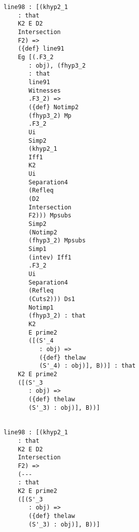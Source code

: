 \documentclass[12pt]{article}
\begin{document}
\begin{verbatim}
                                 line98 : [(khyp2_1 
                                     : that 
                                     K2 E D2 
                                     Intersection 
                                     F2) => 
                                     ({def} line91 
                                     Eg [(.F3_2 
                                        : obj), (fhyp3_2 
                                        : that 
                                        line91 
                                        Witnesses 
                                        .F3_2) => 
                                        ({def} Notimp2 
                                        (fhyp3_2) Mp 
                                        .F3_2 
                                        Ui 
                                        Simp2 
                                        (khyp2_1 
                                        Iff1 
                                        K2 
                                        Ui 
                                        Separation4 
                                        (Refleq 
                                        (D2 
                                        Intersection 
                                        F2))) Mpsubs 
                                        Simp2 
                                        (Notimp2 
                                        (fhyp3_2) Mpsubs 
                                        Simp1 
                                        (intev) Iff1 
                                        .F3_2 
                                        Ui 
                                        Separation4 
                                        (Refleq 
                                        (Cuts2))) Ds1 
                                        Notimp1 
                                        (fhyp3_2) : that 
                                        K2 
                                        E prime2 
                                        ([(S'_4 
                                           : obj) => 
                                           ({def} thelaw 
                                           (S'_4) : obj)], B))] : that 
                                     K2 E prime2 
                                     ([(S'_3 
                                        : obj) => 
                                        ({def} thelaw 
                                        (S'_3) : obj)], B))]


                                 line98 : [(khyp2_1 
                                     : that 
                                     K2 E D2 
                                     Intersection 
                                     F2) => 
                                     (--- 
                                     : that 
                                     K2 E prime2 
                                     ([(S'_3 
                                        : obj) => 
                                        ({def} thelaw 
                                        (S'_3) : obj)], B))]



\end{verbatim}
\end{document}
